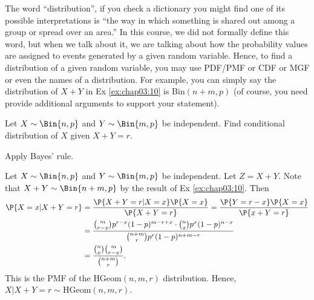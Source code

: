 \begin{remark}
	The word ``distribution'', if you check a dictionary you might find one of its possible interpretations is ``the way in which something is shared out among a group or spread over an area.'' In this course, we did not formally define this word, but when we talk about it, we are talking about how the probability values are assigned to events generated by a given random variable. Hence, to find a distribution of a given random variable, you may use PDF/PMF or CDF or MGF or even the names of a distribution. For example, you can simply say the distribution of $X+Y$ in  Ex \ref{ex:chap03:10} is Bin$(n+m,p)$ (of course, you need provide additional arguments to support your statement).   
\end{remark}

 \begin{exercise}
 	Let $X \sim \Bin{n, p}$ and $Y \sim \Bin{m, p}$ be independent. Find conditional distribution of $X$ given $X + Y = r$.
	\begin{hint}
		Apply Bayes' rule.
	\end{hint}
	\begin{solution}
		Let $X \sim \Bin{n, p}$ and $Y \sim \Bin{m, p}$ be independent. Let $Z = X + Y$. Note that $X + Y \sim \Bin{n+m, p}$ by the result of Ex \ref{ex:chap03:10}. Then
		\begin{align*}
			\P{X = x | X + Y = r} & = \frac{\P{X + Y = r | X = x} \P{X = x}}{\P{X + Y = r}} = \frac{\P{Y = r - x} \P{X = x}}{\P{x + Y = r}} \\
			& = \frac{\binom{m}{r - x} p^{r - x} (1 - p)^{m - r + x} \cdot \binom{n}{x} p^x (1 - p)^{n - x}}{\binom{n + m}{r} p^r (1 - p)^{n + m - r}} \\
			& = \frac{\binom{n}{x} \binom{m}{r - x}}{\binom{n + m}{r}}.
		\end{align*}
		This is the PMF of the $\text{HGeom}(n, m, r)$ distribution. Hence, $X | X + Y = r \sim \text{HGeom}(n, m, r)$.
	\end{solution}
\end{exercise}

